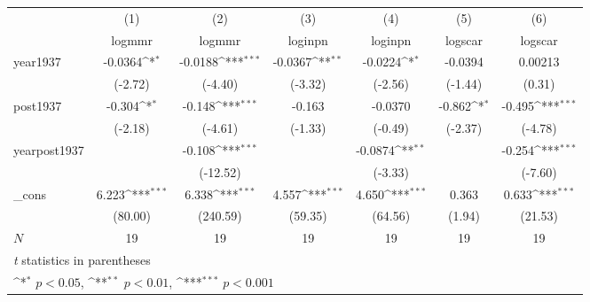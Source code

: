{
\def\sym#1{\ifmmode^{#1}\else\(^{#1}\)\fi}
\begin{tabular}{l*{6}{c}}
\hline\hline
            &\multicolumn{1}{c}{(1)}&\multicolumn{1}{c}{(2)}&\multicolumn{1}{c}{(3)}&\multicolumn{1}{c}{(4)}&\multicolumn{1}{c}{(5)}&\multicolumn{1}{c}{(6)}\\
            &\multicolumn{1}{c}{logmmr}&\multicolumn{1}{c}{logmmr}&\multicolumn{1}{c}{loginpn}&\multicolumn{1}{c}{loginpn}&\multicolumn{1}{c}{logscar}&\multicolumn{1}{c}{logscar}\\
\hline
year1937    &     -0.0364\sym{*}  &     -0.0188\sym{***}&     -0.0367\sym{**} &     -0.0224\sym{*}  &     -0.0394         &     0.00213         \\
            &     (-2.72)         &     (-4.40)         &     (-3.32)         &     (-2.56)         &     (-1.44)         &      (0.31)         \\
[1em]
post1937    &      -0.304\sym{*}  &      -0.148\sym{***}&      -0.163         &     -0.0370         &      -0.862\sym{*}  &      -0.495\sym{***}\\
            &     (-2.18)         &     (-4.61)         &     (-1.33)         &     (-0.49)         &     (-2.37)         &     (-4.78)         \\
[1em]
yearpost1937&                     &      -0.108\sym{***}&                     &     -0.0874\sym{**} &                     &      -0.254\sym{***}\\
            &                     &    (-12.52)         &                     &     (-3.33)         &                     &     (-7.60)         \\
[1em]
\_cons      &       6.223\sym{***}&       6.338\sym{***}&       4.557\sym{***}&       4.650\sym{***}&       0.363         &       0.633\sym{***}\\
            &     (80.00)         &    (240.59)         &     (59.35)         &     (64.56)         &      (1.94)         &     (21.53)         \\
\hline
\(N\)       &          19         &          19         &          19         &          19         &          19         &          19         \\
\hline\hline
\multicolumn{7}{l}{\footnotesize \textit{t} statistics in parentheses}\\
\multicolumn{7}{l}{\footnotesize \sym{*} \(p<0.05\), \sym{**} \(p<0.01\), \sym{***} \(p<0.001\)}\\
\end{tabular}
}
